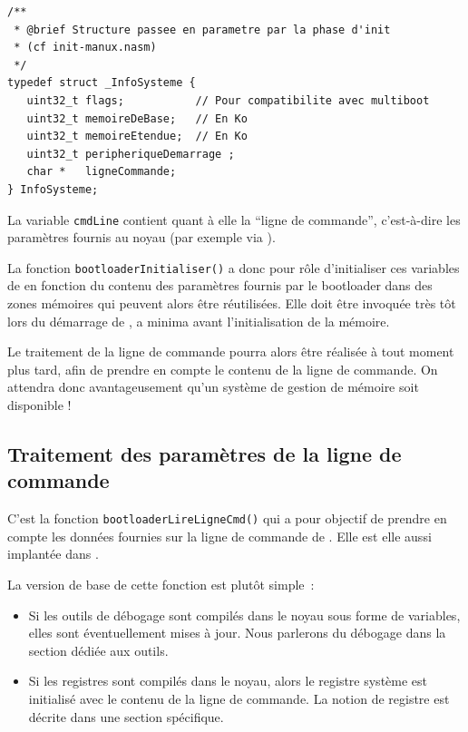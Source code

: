 \begin{lstlisting}
/**
 * @brief Structure passee en parametre par la phase d'init
 * (cf init-manux.nasm)
 */
typedef struct _InfoSysteme {
   uint32_t flags;           // Pour compatibilite avec multiboot
   uint32_t memoireDeBase;   // En Ko
   uint32_t memoireEtendue;  // En Ko
   uint32_t peripheriqueDemarrage ;
   char *   ligneCommande;
} InfoSysteme;
\end{lstlisting}

   La variable \lstinline!cmdLine! contient quant à elle la ``ligne de
commande'', c'est-à-dire les paramètres fournis au noyau (par exemple
via \grub).

   La fonction \lstinline!bootloaderInitialiser()! a donc pour rôle
d'initialiser ces variables de \manux en fonction du contenu des
paramètres fournis par le bootloader dans des zones mémoires qui
peuvent alors être réutilisées. Elle doit être invoquée très tôt lors
du démarrage de \manux, a minima avant l'initialisation de la mémoire.

   Le traitement de la ligne de commande pourra alors être réalisée à tout moment plus tard, afin de prendre en compte le contenu
de la ligne de commande. On attendra donc avantageusement qu'un système
de gestion de mémoire soit disponible !

\subsection{Traitement des paramètres de la ligne de commande}

   C'est la fonction \lstinline!bootloaderLireLigneCmd()! qui a pour
objectif de prendre en compte les données fournies sur la ligne de
commande de \grub. Elle est elle aussi implantée dans
.

La version de base de cette fonction est plutôt simple~:

\begin{itemize}
   \item Si les outils de débogage sont compilés dans le noyau sous
     forme de variables, elles sont éventuellement mises à jour. Nous
     parlerons du débogage dans la section dédiée aux outils.
   \item Si les registres sont compilés dans le noyau, alors le
     registre système est initialisé avec le contenu de la ligne de
     commande. La notion de registre est décrite dans une section
     spécifique.
\end{itemize}


